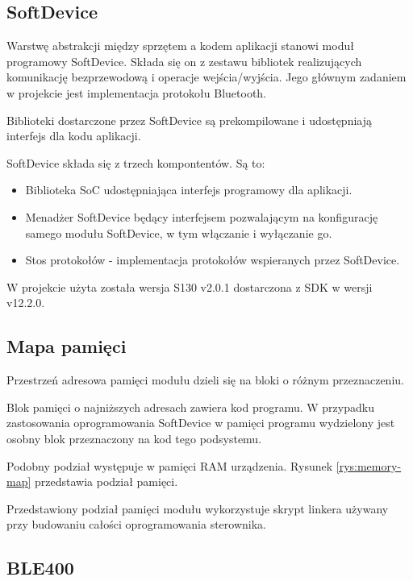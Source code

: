 \subsection{SoftDevice}

Warstwę abstrakcji między sprzętem a kodem aplikacji stanowi moduł programowy
SoftDevice. Składa się on z zestawu bibliotek realizujących komunikację
bezprzewodową i operacje wejścia/wyjścia. Jego głównym zadaniem w projekcie jest
implementacja protokołu Bluetooth.

Biblioteki dostarczone przez SoftDevice są prekompilowane i udostępniają
interfejs dla kodu aplikacji.

SoftDevice składa się z trzech kompontentów. Są to:

\begin{itemize}

	\item Biblioteka SoC udostępniająca interfejs programowy dla aplikacji.

	\item Menadżer SoftDevice będący interfejsem pozwalającym na
		konfigurację samego modułu SoftDevice, w tym włączanie
		i wyłączanie go.

	\item Stos protokołów - implementacja protokołów wspieranych przez
		SoftDevice.

\end{itemize}

W projekcie użyta została wersja S130 v2.0.1 dostarczona z SDK w wersji v12.2.0.

\subsection{Mapa pamięci}

Przestrzeń adresowa pamięci modułu dzieli się na bloki o różnym przeznaczeniu.

Blok pamięci o najniższych adresach zawiera kod programu. W przypadku
zastosowania oprogramowania SoftDevice w pamięci programu wydzielony jest osobny
blok przeznaczony na kod tego podsystemu.

Podobny podział występuje w pamięci RAM urządzenia. Rysunek \ref{rys:memory-map}
przedstawia podział pamięci.

Przedstawiony podział pamięci modułu wykorzystuje skrypt linkera używany przy
budowaniu całości oprogramowania sterownika.

\subsection{BLE400}

